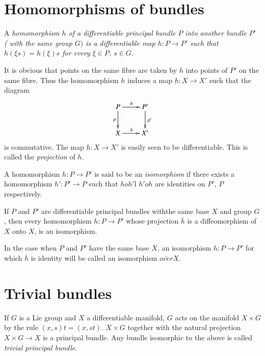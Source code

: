 \section{Homomorphisms of bundles}\label{chap2:sec2} %

\begin{defn}\label{chap2:sec2:def2}%
  A \em{homomorphism} $h$ of a differentiable principal bundle $P$
  into another bundle $P'$ ( with the same group $G)$ is a
  differentiable map $ h : P \to P ' $ such that $ h ( \xi s ) = h
  (\xi) s $ for every $ \xi \in P $, $ s \in G $.  
\end{defn}

It is obvious that points on the same fibre are taken by $h$ into
points of $P'$ on the same fibre. Thus the homomorphism $h$ induces a
map $\underbar{h} : X \to X' $ such that the diagram 
\[
\xymatrix{P \ar[d]_p\ar[r]^h & P'\ar[d]^{p'}\\
X \ar[r]^h & X'}
\]
is commutative. The map $ \underbar{h} : X \to X' $ is easily seen to
be differentiable. This is called the \textit{projection} of $h$. 

\begin{defn}\label{chap2:sec2:def3} %
  A homomorphism $ h : P \to P'$ is said to be an
  \textit{isomorphism} if there exists a homomorphism $ h' : P' \to P
  $ such that $hoh'$l $h' oh$ are identities on $P'$, $P$ respectively. 
\end{defn}

\begin{proposition}\label{chap2:sec2:prop2} %
  If $P$ and  $ P '$ are differentiable principal bundles  with\pageoriginale the
  same base $X$ and group $G$, then every homomorphism $h: P \to P'$
  whose projection $\bar{h}$ is a diffeomorphism of $X$ onto $X$, is
  an isomorphism.  
\end{proposition}

In the case when $P$ and $P'$ have the same base $X$, an isomorphism
$h : P \to P'$ for which $\bar{h}$ is identity will be called an
isomorphism $\bar{over} X$.  

\section{Trivial bundles}\label{chap2:sec3}

If $G$ is a Lie group and $X$ a differentiable manifold, $G$ acts on
the manifold $X \times G$ by the rule $(x, s) t = ( x , st) $. $X
\times G$ together with the natural projection $X \times G \to X $ is
a principal bundle. Any bundle isomorphic to the above is called
\textit{ trivial principal bundle}.
  
